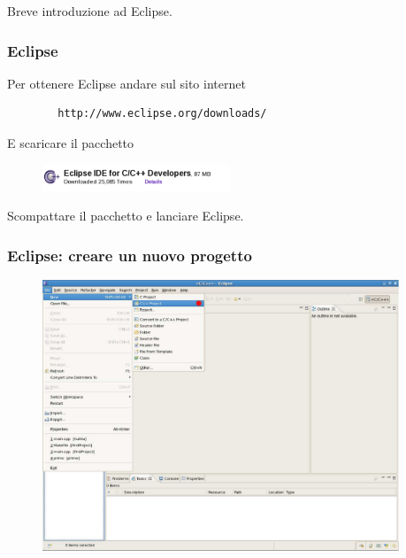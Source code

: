 \documentclass{beamer}
\begin{document}

\begin{frame}[fragile]

    Breve introduzione ad Eclipse.

\end{frame}


\begin{frame}[fragile]

    \frametitle{Eclipse}

    Per ottenere Eclipse andare sul sito internet

    \begin{verbatim}
        http://www.eclipse.org/downloads/
    \end{verbatim}

    E scaricare il pacchetto

    \begin{figure}
        \centering
        \includegraphics[width=0.5\textwidth]{./images/eclipselogo}
    \end{figure}

    Scompattare il pacchetto e lanciare Eclipse.

\end{frame}


\begin{frame}[fragile]

    \frametitle{Eclipse: creare un nuovo progetto}

    \begin{figure}
        \centering
        \includegraphics[width=0.95\textwidth]{./images/eclipse1}
    \end{figure}

\end{frame}
\end{document}
